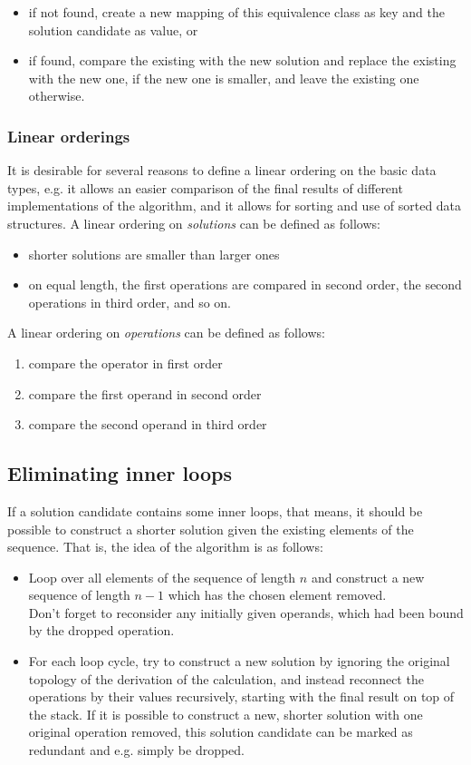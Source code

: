 \documentclass[english]{article}
\begin{document}
\begin{itemize}
	\item if not found, create a new mapping of this equivalence class as key and the solution candidate as value, or
	\item if found, compare the existing with the new solution and replace the existing with the new one, if the new one is smaller, and leave the existing one otherwise.
\end{itemize}

\subsubsection{Linear orderings}

It is desirable for several reasons to define a linear ordering on the basic data types, e.g. it allows an easier comparison of the final results of different implementations of the algorithm, and it allows for sorting and use of sorted data structures.
A linear ordering on \emph{solutions} can be defined as follows:
\begin{itemize}
	\item shorter solutions are smaller than larger ones
	\item on equal length, the first operations are compared in second order, the second operations in third order, and so on.
\end{itemize}

A linear ordering on \emph{operations} can be defined as follows:
\begin{enumerate}
	\item compare the operator in first order
	\item compare the first operand in second order
	\item compare the second operand in third order
\end{enumerate}

\subsection{Eliminating inner loops}

If a solution candidate contains some inner loops, that means, it should be possible to construct a shorter solution given the existing elements of the sequence. That is, the idea of the algorithm is as follows:

\begin{itemize}
	\item Loop over all elements of the sequence of length $n$ and construct a new sequence of length $n-1$ which has the chosen element removed.\\
	Don't forget to reconsider any initially given operands, which had been bound by the dropped operation.
	\item For each loop cycle, try to construct a new solution by ignoring the original topology of the derivation of the calculation, and instead reconnect the operations by their values recursively, starting with the final result on top of the stack. If it is possible to construct a new, shorter solution with one original operation removed, this solution candidate can be marked as redundant and e.g. simply be dropped.
\end{itemize}
\end{document}
